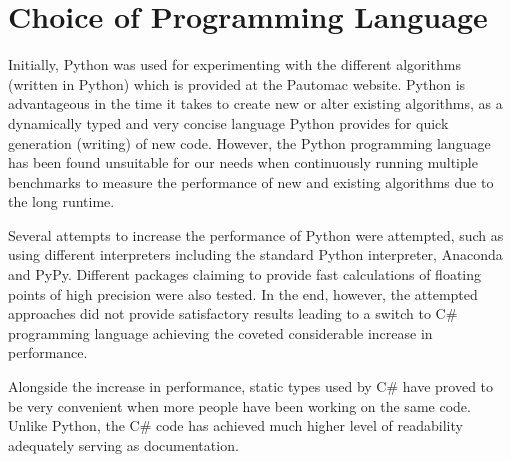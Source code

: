 \section{Choice of Programming Language}
Initially, Python was used for experimenting with the different algorithms (written in Python) which is provided at the Pautomac website. Python is advantageous in the time it takes to create new or alter existing algorithms, as a dynamically typed and very concise language Python provides for quick generation (writing) of new code. However, the Python programming language has been found unsuitable for our needs when continuously running multiple benchmarks to measure the performance of new and existing algorithms due to the long runtime.

Several attempts to increase the performance of Python were attempted, such as using different interpreters including the standard Python interpreter, Anaconda and PyPy. Different packages claiming to provide fast calculations of floating points of high precision were also tested. In the end, however, the attempted approaches did not provide satisfactory results leading to a switch to C\# programming language achieving the coveted considerable increase in performance.

Alongside the increase in performance, static types used by  C\# have proved to be very convenient when more people have been working on the same code. Unlike Python, the C\# code has achieved much higher level of readability adequately serving as documentation.